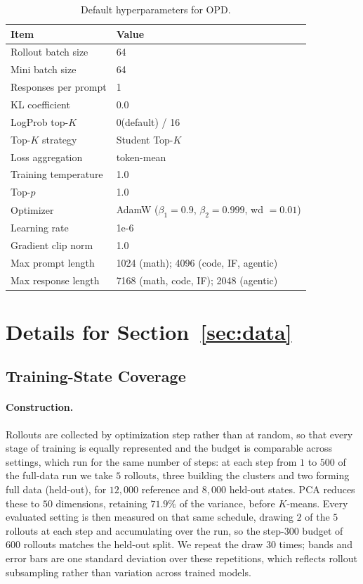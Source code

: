 \begin{table}[t]
\centering
\caption{Default hyperparameters for OPD.}
\label{tab:opd-hyperparams}
\small
\begin{tabular}{ll}
\toprule
\textbf{Item} & \textbf{Value} \\
\midrule
Rollout batch size      & 64 \\
Mini batch size         & 64 \\
Responses per prompt    & 1 \\
KL coefficient          & 0.0 \\
LogProb top-$K$         & 0(default) / 16 \\
Top-$K$ strategy        & Student Top-$K$ \\
Loss aggregation        & token-mean \\
Training temperature    & 1.0 \\
Top-$p$                 & 1.0 \\
Optimizer               & AdamW ($\beta_1{=}0.9$, $\beta_2{=}0.999$, wd $=0.01$) \\
Learning rate           & 1e-6 \\
Gradient clip norm      & 1.0 \\
Max prompt length       & 1024 (math); 4096 (code, IF, agentic) \\
Max response length     & 7168 (math, code, IF); 2048 (agentic) \\
\bottomrule
\end{tabular}
\end{table}


\section{Details for Section~\ref{sec:data}}

\subsection{Training-State Coverage}
\label{app:state-coverage}
\label{app:state-coverage-robustness}

\paragraph{Construction.}
Rollouts are collected by optimization step rather than at random, so that every stage of training is equally represented and the budget is comparable across settings, which run for the same number of steps: at each step from \(1\) to \(500\) of the full-data run we take \(5\) rollouts, three building the clusters and two forming full data (held-out), for \(12{,}000\) reference and \(8{,}000\) held-out states. PCA reduces these to \(50\) dimensions, retaining \(71.9\%\) of the variance, before \(K\)-means. Every evaluated setting is then measured on that same schedule, drawing \(2\) of the \(5\) rollouts at each step and accumulating over the run, so the step-\(300\) budget of \(600\) rollouts matches the held-out split. We repeat the draw \(30\) times; bands and error bars are one standard deviation over these repetitions, which reflects rollout subsampling rather than variation across trained models.


